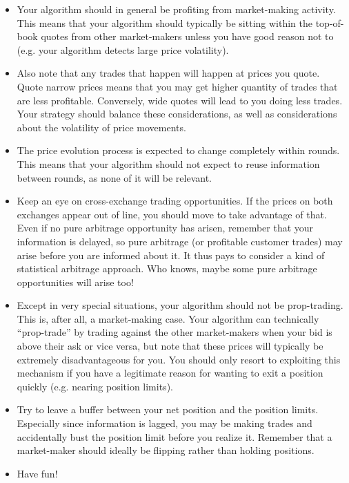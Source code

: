 \documentclass[12pt]{article}
\begin{document}
\begin{itemize}
  \item Your algorithm should in general be profiting from market-making activity. This means that your algorithm should typically be sitting within the top-of-book quotes from other market-makers unless you have good reason not to (e.g. your algorithm detects large price volatility).
  \item Also note that any trades that happen will happen at prices you quote. Quote narrow prices means that you may get higher quantity of trades that are less profitable. Conversely, wide quotes will lead to you doing less trades. Your strategy should balance these considerations, as well as considerations about the volatility of price movements.
  \item The price evolution process is expected to change completely within rounds. This means that your algorithm should not expect to reuse information between rounds, as none of it will be relevant.
  \item Keep an eye on cross-exchange trading opportunities. If the prices on both exchanges appear out of line, you should move to take advantage of that. Even if no pure arbitrage opportunity has arisen, remember that your information is delayed, so pure arbitrage (or profitable customer trades) may arise before you are informed about it. It thus pays to consider a kind of statistical arbitrage approach. Who knows, maybe some pure arbitrage opportunities will arise too!
  \item Except in very special situations, your algorithm should not be prop-trading. This is, after all, a market-making case. Your algorithm can technically “prop-trade” by trading against the other market-makers when your bid is above their ask or vice versa, but note that these prices will typically be extremely disadvantageous for you. You should only resort to exploiting this mechanism if you have a legitimate reason for wanting to exit a position quickly (e.g. nearing position limits).
  \item Try to leave a buffer between your net position and the position limits. Especially since information is lagged, you may be making trades and accidentally bust the position limit before you realize it. Remember that a market-maker should ideally be flipping rather than holding positions.
  \item Have fun!
\end{itemize}

\pagebreak
\end{document}
